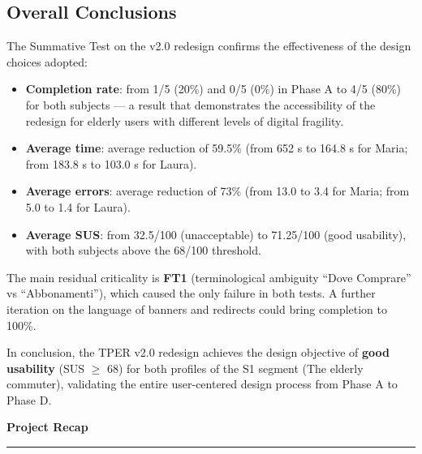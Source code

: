 ﻿\documentclass[11pt,a4paper]{article}
\begin{document}
\subsection*{Overall Conclusions}
\begin{tcolorbox}[base]
The Summative Test on the v2.0 redesign confirms the effectiveness of the
design choices adopted:

\begin{itemize}[leftmargin=*]
  \item \textbf{Completion rate}: from 1/5 (20\%) and 0/5 (0\%)
  in Phase A to 4/5 (80\%) for both subjects --- a result
  that demonstrates the accessibility of the redesign for elderly users
  with different levels of digital fragility.
  \item \textbf{Average time}: average reduction of 59.5\% (from
  652 s to 164.8 s for Maria; from 183.8 s to 103.0 s for Laura).
  \item \textbf{Average errors}: average reduction of 73\% (from 13.0
  to 3.4 for Maria; from 5.0 to 1.4 for Laura).
  \item \textbf{Average SUS}: from 32.5/100 (unacceptable) to
  71.25/100 (good usability), with both subjects above
  the 68/100 threshold.
\end{itemize}

\medskip

The main residual criticality is \textbf{FT1} (terminological
ambiguity ``Dove Comprare'' vs ``Abbonamenti''), which
caused the only failure in both tests. A further
iteration on the language of banners and redirects
could bring completion to 100\%.

\medskip

In conclusion, the TPER v2.0 redesign achieves the design
objective of \textbf{good usability} (SUS $\ge$ 68) for
both profiles of the S1 segment (The elderly commuter),
validating the entire user-centered design process
from Phase A to Phase D.
\end{tcolorbox}


\newpage
\begin{center}
  {\color{primaryColor}\LARGE\bfseries\sffamily Project Recap}\\[0.3cm]
  \color{borderColor}\hrule
\end{center}

\vspace{0.4cm}
\end{document}
